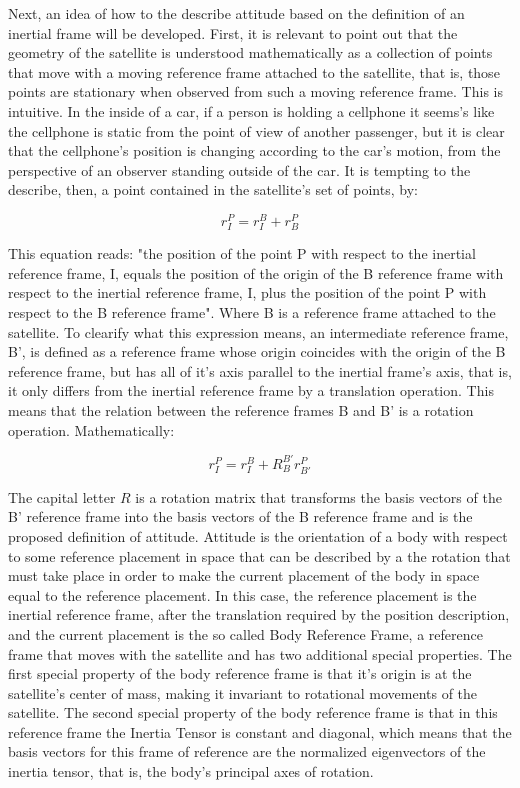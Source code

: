 \indent
	Next, an idea of how to the describe attitude based on the definition of an inertial frame will be developed. First, it is relevant to point out that the geometry of the satellite is understood mathematically as a collection of points that move with a moving reference frame attached to the satellite, that is, those points are stationary when observed from such a moving reference frame. This is intuitive. In the inside of a car, if a person is holding a cellphone it seems's like the cellphone is static from the point of view of another passenger, but it is clear that the cellphone's position is changing according to the car's motion, from the perspective of an observer standing outside of the car. It is tempting to the describe, then, a point contained in the satellite's set of points, by:

\begin{equation}
	r^P_I = r^{B}_I + r^P_{B}
\end{equation}

\indent
	This equation reads: "the position of the point P with respect to the inertial reference frame, I, equals the position of the origin of the B reference frame with respect to the inertial reference frame, I, plus the position of the point P with respect to the B reference frame". Where B is a reference frame attached to the satellite. To clearify what this expression means, an intermediate reference frame, B', is defined as a reference frame whose origin coincides with the origin of the B reference frame, but has all of it's axis parallel to the inertial frame's axis, that is, it only differs from the inertial reference frame by a translation operation. This means that the relation between the reference frames B and B' is a rotation operation. Mathematically: 

\begin{equation}
	r^P_I = r^{B}_I + R ^{B'}_{B} r^P_{B'}
\end{equation}

\indent
	The capital letter $R$ is a rotation matrix that transforms the basis vectors of the B' reference frame into the basis vectors of the B reference frame and is the proposed definition of attitude. Attitude is the orientation of a body with respect to some reference placement in space that can be described by a the rotation that must take place in order to make the current placement of the body in space equal to the reference placement. In this case, the reference placement is the inertial reference frame, after the translation required by the position description, and the current placement is the so called Body Reference Frame, a reference frame that moves with the satellite and has two additional special properties. The first special property of the body reference frame is that it's origin is at the satellite's center of mass, making it invariant to rotational movements of the satellite. The second special property of the body reference frame is that in this reference frame the Inertia Tensor is constant and diagonal, which means that the basis vectors for this frame of reference are the normalized eigenvectors of the inertia tensor, that is, the body's principal axes of rotation.
